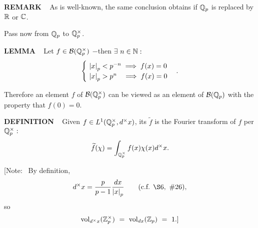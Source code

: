 \begin{x}{\small\bf REMARK} \ %
As is well-known, the same conclusion obtains if $\mathbb{Q}_p$ is replaced by $\mathbb{R}$ or $\mathbb{C}$.
\end{x}

\vspace{0.1cm}

Pass now from  $\mathbb{Q}_p$ to  $\mathbb{Q}_p^\times$.

\vspace{0.2cm}

\begin{x}{\small\bf LEMMA} \ %
Let $ f \in \mathcal{B}(\mathbb{Q}_p^\times)$ $-$then $\exists$ $n \in \mathbb{N}:$
\[
\begin{cases}
\ \left\vert x\right\vert_p < p^{-n} 	\implies f(x) = 0\\
\ \left\vert x\right\vert_p > p^{n} \ \ 	\implies f(x) = 0
\end{cases}
.
\]

Therefore an element $f$ of $\mathcal{B}(\mathbb{Q}_p^\times)$ can be viewed as an element of $\mathcal{B}(\mathbb{Q}_p)$ with the property that $f(0) = 0$.
\end{x}

\vspace{0.1cm}

\begin{x}{\small\bf DEFINITION} \ %
Given $f \in L^1(\mathbb{Q}_p^\times, d^\times x)$, its 
$\widetilde{f}$ 
is the Fourier transform of $f$ per $\mathbb{Q}_p^\times:$
\[
\widetilde{f}(\chi) = \int_{\mathbb{Q}_p^\times} f(x) \chi(x) d^\times x.
\]

[Note: \  
By definition, 
\[
d^\times x = \frac{p}{p-1} \frac{dx}{\abs{x}_p}		\qquad \text{(c.f. } \S 6, \ \# 26),
\]
so
\[
\text{vol}_{d^\times x}(\mathbb{Z}_p^\times) \ =\  \text{vol}_{dx}(\mathbb{Z}_p) \ =\  1.]
\]
\end{x}

\vspace{0.1cm}


